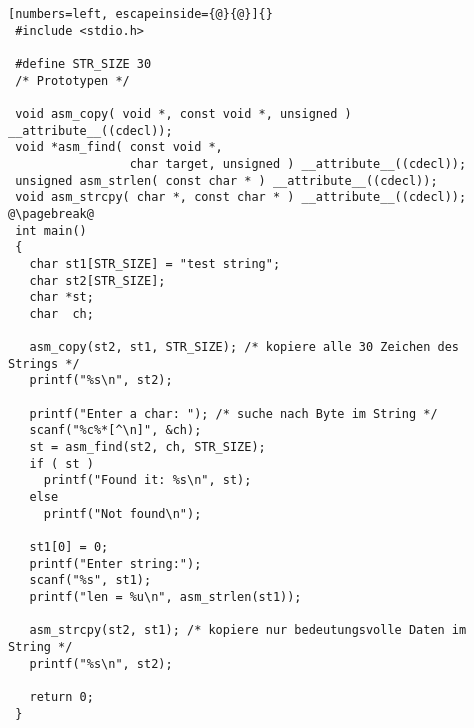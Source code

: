 \begin{lstlisting}[numbers=left, escapeinside={@}{@}]{}
 #include <stdio.h>

 #define STR_SIZE 30
 /* Prototypen */

 void asm_copy( void *, const void *, unsigned ) __attribute__((cdecl));
 void *asm_find( const void *,
                 char target, unsigned ) __attribute__((cdecl));
 unsigned asm_strlen( const char * ) __attribute__((cdecl));
 void asm_strcpy( char *, const char * ) __attribute__((cdecl));
@\pagebreak@
 int main()
 {
   char st1[STR_SIZE] = "test string";
   char st2[STR_SIZE];
   char *st;
   char  ch;

   asm_copy(st2, st1, STR_SIZE); /* kopiere alle 30 Zeichen des Strings */
   printf("%s\n", st2);

   printf("Enter a char: "); /* suche nach Byte im String */
   scanf("%c%*[^\n]", &ch);
   st = asm_find(st2, ch, STR_SIZE);
   if ( st )
     printf("Found it: %s\n", st);
   else
     printf("Not found\n");

   st1[0] = 0;
   printf("Enter string:");
   scanf("%s", st1);
   printf("len = %u\n", asm_strlen(st1));

   asm_strcpy(st2, st1); /* kopiere nur bedeutungsvolle Daten im String */
   printf("%s\n", st2);

   return 0;
 }
\end{lstlisting}
